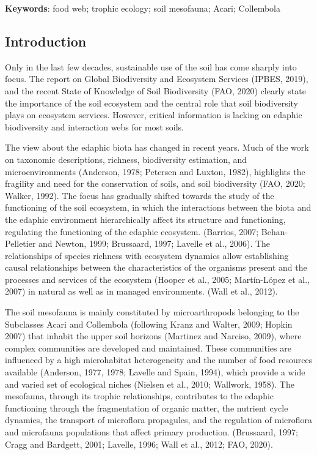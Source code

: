 \documentclass[10pt,oneside]{article}
\begin{document}
\textbf{Keywords}: food web; trophic ecology; soil mesofauna; Acari;
Collembola

\hypertarget{introduction}{%
\subsection{Introduction}\label{introduction}}

Only in the last few decades, sustainable use of the soil has come
sharply into focus. The report on Global Biodiversity and Ecosystem
Services (IPBES, 2019), and the recent State of Knowledge of Soil
Biodiversity (FAO, 2020) clearly state the importance of the soil
ecosystem and the central role that soil biodiversity plays on ecosystem
services. However, critical information is lacking on edaphic
biodiversity and interaction webs for most soils.

The view about the edaphic biota has changed in recent years. Much of
the work on taxonomic descriptions, richness, biodiversity estimation,
and microenvironments (Anderson, 1978; Petersen and Luxton, 1982),
highlights the fragility and need for the conservation of soils, and
soil biodiversity (FAO, 2020; Walker, 1992). The focus has gradually
shifted towards the study of the functioning of the soil ecosystem, in
which the interactions between the biota and the edaphic environment
hierarchically affect its structure and functioning, regulating the
functioning of the edaphic ecosystem. (Barrios, 2007; Behan-Pelletier
and Newton, 1999; Brussaard, 1997; Lavelle et al., 2006). The
relationships of species richness with ecosystem dynamics allow
establishing causal relationships between the characteristics of the
organisms present and the processes and services of the ecosystem
(Hooper et al., 2005; Martín-López et al., 2007) in natural as well as
in managed environments. (Wall et al., 2012).

The soil mesofauna is mainly constituted by microarthropods belonging to
the Subclasses Acari and Collembola (following Kranz and Walter, 2009;
Hopkin 2007) that inhabit the upper soil horizons (Martinez and Narciso,
2009), where complex communities are developed and maintained. These
communities are influenced by a high microhabitat heterogeneity and the
number of food resources available (Anderson, 1977, 1978; Lavelle and
Spain, 1994), which provide a wide and varied set of ecological niches
(Nielsen et al., 2010; Wallwork, 1958). The mesofauna, through its
trophic relationships, contributes to the edaphic functioning through
the fragmentation of organic matter, the nutrient cycle dynamics, the
transport of microflora propagules, and the regulation of microflora and
microfauna populations that affect primary production. (Brussaard, 1997;
Cragg and Bardgett, 2001; Lavelle, 1996; Wall et al., 2012; FAO, 2020).
\end{document}

